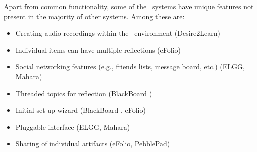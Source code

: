 Apart from common functionality, some of the \ep~systems have unique features
not present in the majority of other systems. Among these are:
\begin{itemize}
  \item Creating audio recordings within the \ep~environment (Desire2Learn)
  \item Individual items can have multiple reflections (eFolio)
  \item Social networking features (e.g., friends lists, message board, etc.)
  (ELGG, Mahara)
  \item Threaded topics for reflection (BlackBoard \ep)
  \item Initial set-up wizard (BlackBoard \ep, eFolio)
  \item Pluggable interface (ELGG, Mahara)
  \item Sharing of individual artifacts (eFolio, PebblePad)
\end{itemize}

